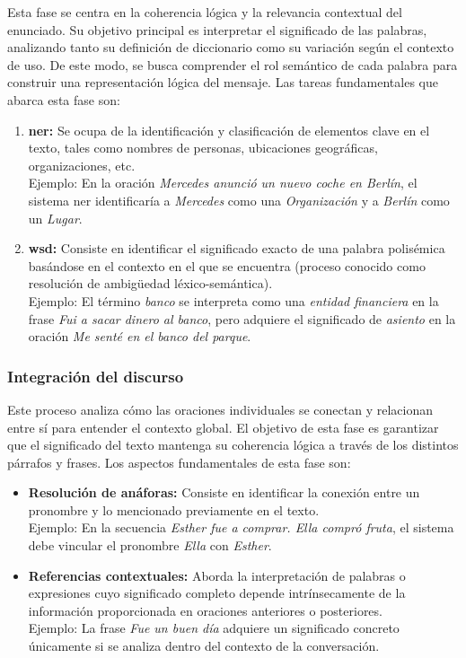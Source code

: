 Esta fase se centra en la coherencia lógica y la relevancia contextual del enunciado. Su objetivo principal es interpretar el significado de las palabras, analizando tanto su definición de diccionario como su variación según el contexto de uso. De este modo, se busca comprender el rol semántico de cada palabra para construir una representación lógica del mensaje. Las tareas fundamentales que abarca esta fase son:

\begin{enumerate}
    \item \textbf{\gls{ner}:} Se ocupa de la identificación y clasificación de elementos clave en el texto, tales como nombres de personas, ubicaciones geográficas, organizaciones, etc.
          \\
          Ejemplo: En la oración \textit{Mercedes anunció un nuevo coche en Berlín}, el sistema \gls{ner} identificaría a \textit{Mercedes} como una \textit{Organización} y a \textit{Berlín} como un \textit{Lugar}.

    \item \textbf{\gls{wsd}:} Consiste en identificar el significado exacto de una palabra polisémica basándose en el contexto en el que se encuentra (proceso conocido como resolución de ambigüedad léxico-semántica).
          \\
          Ejemplo: El término \textit{banco} se interpreta como una \textit{entidad financiera} en la frase \textit{Fui a sacar dinero al banco}, pero adquiere el significado de \textit{asiento} en la oración \textit{Me senté en el banco del parque}.
\end{enumerate}

\subsubsection{Integración del discurso}

Este proceso analiza cómo las oraciones individuales se conectan y relacionan entre sí para entender el contexto global. El objetivo de esta fase es garantizar que el significado del texto mantenga su coherencia lógica a través de los distintos párrafos y frases. Los aspectos fundamentales de esta fase son:

\begin{itemize}
    \item \textbf{Resolución de anáforas:} Consiste en identificar la conexión entre un pronombre y lo mencionado previamente en el texto.
          \\
          Ejemplo: En la secuencia \textit{Esther fue a comprar. Ella compró fruta}, el sistema debe vincular el pronombre \textit{Ella} con \textit{Esther}.

    \item \textbf{Referencias contextuales:} Aborda la interpretación de palabras o expresiones cuyo significado completo depende intrínsecamente de la información proporcionada en oraciones anteriores o posteriores.
          \\
          Ejemplo: La frase \textit{Fue un buen día} adquiere un significado concreto únicamente si se analiza dentro del contexto de la conversación.
\end{itemize}


